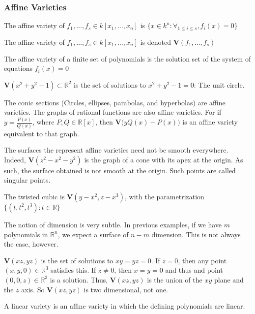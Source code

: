 \documentclass[crop=false,class=book]{standalone}
\begin{document}
\subsubsection{Affine Varieties}
\begin{definition}
The affine variety of $f_1,\hdots, f_s \in k[x_1,\hdots ,x_n]$ is $\{x\in k^n:\forall_{1\leq i \leq s},f_i(x) = 0\}$
\end{definition}
\begin{notation}
The affine variety of $f_{1},\hdots,f_{s}\in k[x_{1},\hdots,x_{n}]$ is denoted $\mathbf{V}(f_1,\hdots, f_s)$
\end{notation}
The affine variety of a finite set of polynomials is the solution set of the system of equations $f_{i}(x)=0$
\begin{example}
$\mathbf{V}(x^2+y^2-1)\subset\mathbb{R}^2$ is the set of solutions to $x^2+y^2-1 = 0$: The unit circle.
\end{example}
\begin{example}
The conic sections (Circles, ellipses, parabolas, and hyperbolas) are affine varieties. The graphs of rational functions are also affine varieties. For if $y = \frac{P(x)}{Q(x)}$, where $P,Q\in \mathbb{R}[x]$, then $\mathbf{V}\big(yQ(x)-P(x)\big)$ is an affine variety equivalent to that graph.
\end{example}
\begin{example}
The surfaces the represent affine varieties need not be smooth everywhere. Indeed, $\mathbf{V}(z^2-x^2-y^2)$ is the graph of a cone with its apex at the origin. As such, the surface obtained is not smooth at the origin. Such points are called singular points.
\end{example}
\begin{example}
The twisted cubic is $\mathbf{V}(y-x^2,z-x^3)$, with the parametrization $\{(t,t^2,t^3):t\in \mathbb{R}\}$
\end{example}
The notion of dimension is very subtle. In previous examples, if we have $m$ polynomials in $\mathbb{R}^n$, we expect a surface of $n-m$ dimension. This is not always the case, however.
\begin{example}
$\mathbf{V}(xz,yz)$ is the set of solutions to $xy=yz=0$. If $z=0$, then any point $(x,y,0)\in \mathbb{R}^3$ satisfies this. If $z\ne 0$, then $x=y=0$ and thus and point $(0,0,z)\in \mathbb{R}^3$ is a solution. Thus, $\mathbf{V}(xz,yz)$ is the union of the $xy$ plane and the $z$ axis. So $\mathbf{V}(xz,yz)$ is two dimensional, not one.
\end{example}
\begin{definition}
A linear variety is an affine variety in which the defining polynomials are linear.
\end{definition}
\end{document}
